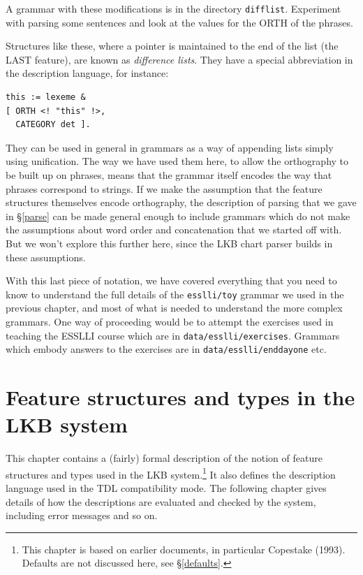 \documentclass[12pt]{report}
\newcommand{\filename}[1]{{\tt #1}}
\newcommand{\newterm}[1]{{\it #1}}
\begin{document}
A grammar with these modifications is in the directory \filename{difflist}.
Experiment with parsing some sentences 
and look at the values for the ORTH of the phrases.

Structures like these, where a pointer is maintained to the end of the
list (the LAST feature), are known as \newterm{difference lists}.
They have a special abbreviation in the description language, for instance:
\begin{verbatim}
this := lexeme &
[ ORTH <! "this" !>,
  CATEGORY det ].
\end{verbatim}

They can be used in general in grammars as a way of appending lists
simply using unification.
The way we have used them here, to allow the orthography
to be built up on phrases, means that the grammar itself encodes
the way that phrases correspond to strings. 
If we make the assumption that the feature structures themselves
encode orthography, the description of parsing that we gave in
\S\ref{parse} can be made general enough to include grammars
which do not make the assumptions about word order and
concatenation that we started off with.  But we won't explore this
further here, since the LKB chart parser builds in these assumptions.

With this last piece of notation, we have covered everything that
you need to know to understand the full details of the
\filename{esslli/toy} grammar
we used in the previous chapter, and most of what is needed
to understand the more complex grammars.
One way of proceeding would be to attempt the exercises used
in teaching the ESSLLI course which are
in \filename{data/esslli/exercises}.  Grammars which embody
answers to the exercises are in \filename{data/esslli/enddayone} etc.


\chapter{Feature structures and types in the LKB system}
\label{formal}

This chapter contains a (fairly) formal description of the notion of
feature structures and types used in the LKB system.\footnote{This chapter is based
on earlier documents, in particular Copestake (1993).  
Defaults are not discussed here, see \S\ref{defaults}.}
It also defines the description language used in the TDL compatibility mode. 
The following chapter gives details of how the descriptions are
evaluated and checked by the system, including error messages and so on.
 
\end{document}

